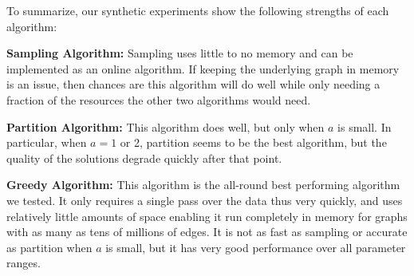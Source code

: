 
To summarize, our synthetic experiments show the following strengths of each algorithm:  

\textbf{Sampling Algorithm:} Sampling uses little to no memory and can
be implemented as an online algorithm. If keeping the underlying graph in
memory is an issue, then chances are this algorithm will do well while only needing
a fraction of the resources the other two algorithms would need.  

\textbf{Partition Algorithm:} This algorithm does well, but only when $a$ is small.
In particular, when $a=1$ or 2, partition seems to be the best algorithm, but the quality
of the solutions degrade quickly after that point.  

\textbf{Greedy Algorithm:} This algorithm is the all-round best performing algorithm we tested.
It only requires a single pass over the data thus very quickly,  and uses
relatively little amounts of space enabling it run completely in memory for graphs with
as many as tens of millions of edges. It is not as fast as sampling or accurate as partition
when $a$ is small, but it has very good performance over all parameter ranges.
